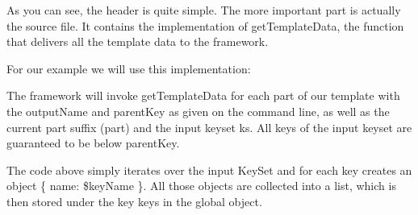 As you can see, the header is quite simple. The more important part is actually the source file. It contains the implementation of {\ttfamily get\+Template\+Data}, the function that delivers all the template data to the framework.

For our example we will use this implementation\+:


\begin{DoxyCode}{0}
\DoxyCodeLine{\textcolor{preprocessor}{\#include "example.hpp"}}
\DoxyCodeLine{}
\DoxyCodeLine{\textcolor{keyword}{}\{}
\DoxyCodeLine{}
\DoxyCodeLine{}
\DoxyCodeLine{    \{}
\DoxyCodeLine{}
\DoxyCodeLine{}
\DoxyCodeLine{    \}}
\DoxyCodeLine{}
\DoxyCodeLine{}
\DoxyCodeLine{\}}
\end{DoxyCode}


The framework will invoke {\ttfamily get\+Template\+Data} for each part of our template with the {\ttfamily output\+Name} and {\ttfamily parent\+Key} as given on the command line, as well as the current part suffix ({\ttfamily part}) and the input keyset {\ttfamily ks}. All keys of the input keyset are guaranteed to be below {\ttfamily parent\+Key}.

The code above simply iterates over the input Key\+Set and for each key creates an object {\ttfamily \{ name\+: \$key\+Name \}}. All those objects are collected into a list, which is then stored under the key {\ttfamily keys} in the global object.

